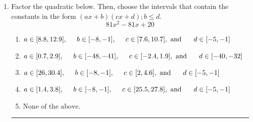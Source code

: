 \documentclass[14pt]{extbook}
\newcommand{\litem}[1]{\item#1\hspace*{-1cm}\rule{\textwidth}{0.4pt}}
\begin{document}
\begin{enumerate}
{\begin{enumerate}[label=\Alph*.]
\end{enumerate} }
\litem{
Factor the quadratic below. Then, choose the intervals that contain the constants in the form $(ax+b)(cx+d); b \leq d.$\[ 81x^{2} -81 x + 20 \]\begin{enumerate}[label=\Alph*.]
\item \( a \in [8.8, 12.9], \hspace*{5mm} b \in [-8, -1], \hspace*{5mm} c \in [7.6, 10.7], \text{ and } \hspace*{5mm} d \in [-5, -1] \)
\item \( a \in [0.7, 2.9], \hspace*{5mm} b \in [-48, -41], \hspace*{5mm} c \in [-2.4, 1.9], \text{ and } \hspace*{5mm} d \in [-40, -32] \)
\item \( a \in [26, 30.4], \hspace*{5mm} b \in [-8, -1], \hspace*{5mm} c \in [2, 4.6], \text{ and } \hspace*{5mm} d \in [-5, -1] \)
\item \( a \in [1.4, 3.8], \hspace*{5mm} b \in [-8, -1], \hspace*{5mm} c \in [25.5, 27.8], \text{ and } \hspace*{5mm} d \in [-5, -1] \)
\item \( \text{None of the above.} \)


\end{enumerate}}
\end{enumerate}
\end{document}

